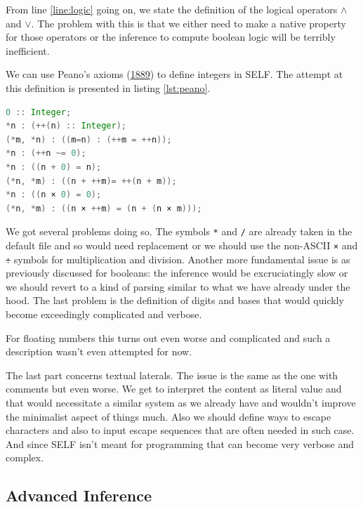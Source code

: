 \documentclass[11pt,a4paper,twoside,openright,titlepage,numbers=noenddot,headinclude,cleardoublepage=empty,openany]{scrreprt}
\theoremstyle{plain}
\theoremstyle{definition}
\theoremstyle{remark}
\newcommand{\passthrough}[1]{#1}
\begin{document}
From line \ref{line:logic} going on, we state the definition of the
logical operators \(\land\) and \(\lor\). The problem with this is that
we either need to make a native property for those operators or the
inference to compute boolean logic will be terribly inefficient.

We can use Peano's axioms
(\protect\hyperlink{ref-peano_arithmetices_1889}{1889}) to define
integers in SELF. The attempt at this definition is presented in
listing \ref{lst:peano}.

\begin{lstlisting}[language=Java, caption={Possible integration of the Peano axioms in SELF.}, label=lst:peano]
0 :: Integer;
*n : (++(n) :: Integer);
(*m, *n) : ((m=n) : (++m = ++n));
*n : (++n ~= 0);
*n : ((n + 0) = n);
(*n, *m) : ((n + ++m)= ++(n + m));
*n : ((n × 0) = 0);
(*n, *m) : ((n × ++m) = (n + (n × m)));
\end{lstlisting}

We got several problems doing so. The symbols
\passthrough{\lstinline!*!} and \passthrough{\lstinline!/!} are already
taken in the default file and so would need replacement or we should use
the non-ASCII \passthrough{\lstinline!×!} and
\passthrough{\lstinline!÷!} symbols for multiplication and division.
Another more fundamental issue is as previously discussed for booleans:
the inference would be excruciatingly slow or we should revert to a kind
of parsing similar to what we have already under the hood. The last
problem is the definition of digits and bases that would quickly become
exceedingly complicated and verbose.

For floating numbers this turns out even worse and complicated and such
a description wasn't even attempted for now.

The last part concerns textual laterals. The issue is the same as the
one with comments but even worse. We get to interpret the content as
literal value and that would necessitate a similar system as we already
have and wouldn't improve the minimalist aspect of things much. Also we
should define ways to escape characters and also to input escape
sequences that are often needed in such case. And since SELF isn't meant
for programming that can become very verbose and complex.

\hypertarget{advanced-inference}{%
\subsection{Advanced Inference}\label{advanced-inference}}
\end{document}
